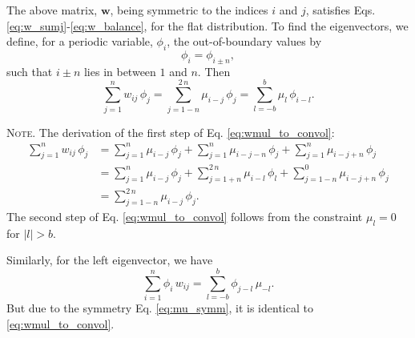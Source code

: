 \documentclass[reprint, floatfix]{revtex4-1}
\newcommand{\note}[1]{{\color{DarkGreen}\footnotesize \textsc{Note.} #1}}
\begin{document}
The above matrix, $\mathbf w$,
being symmetric to the indices $i$ and $j$,
satisfies Eqs. \eqref{eq:w_sumj}-\eqref{eq:w_balance},
for the flat distribution.
%
To find the eigenvectors,
we define, for a periodic variable, $\phi_i$,
the out-of-boundary values by
%
\begin{equation}
  \phi_i = \phi_{i \pm n},
\label{eq:phi_pbc}
\end{equation}
%
such that $i \pm n$ lies in between $1$ and $n$.
%
Then
%
\begin{equation}
  \sum_{ j = 1 }^n
    w_{ij} \, \phi_j
  =
  \sum_{ j = 1 - n }^{ 2 \, n }
    \mu_{i - j} \, \phi_j
  =
  \sum_{ l = -b }^{ b }
    \mu_l \, \phi_{ i - l}
  .
\label{eq:wmul_to_convol}
\end{equation}
%
\note{The derivation of the first step of
  Eq. \eqref{eq:wmul_to_convol}:
$$
\begin{aligned}
  \sum_{j = 1}^n
    w_{ij} \, \phi_j
  &=
  \sum_{j = 1}^n
    \mu_{i - j} \, \phi_j
  +
  \sum_{j = 1}^n
    \mu_{i - j - n} \, \phi_j
  +
  \sum_{j = 1}^n
    \mu_{i - j + n} \, \phi_j
  \\
  &=
  \sum_{j = 1}^n
    \mu_{i - j} \, \phi_j
  +
  \sum_{j = 1+n}^{2 \, n}
    \mu_{i - l} \, \phi_l
  +
  \sum_{j = 1-n}^0
    \mu_{i - j + n} \, \phi_j
  \\
  &=
  \sum_{j = 1-n}^{2 \, n}
    \mu_{i - j} \, \phi_j
  .
\end{aligned}
$$
The second step of Eq. \eqref{eq:wmul_to_convol}
follows from the constraint $\mu_l = 0$ for $|l| > b$.

Similarly,
for the left eigenvector, we have
$$
  \sum_{ i = 1 }^n
    \phi_i \, w_{ij}
  =
  \sum_{ l = -b }^b
    \phi_{j - l} \, \mu_{-l}
  .
$$
But due to the symmetry Eq. \eqref{eq:mu_symm},
it is identical to \eqref{eq:wmul_to_convol}.
}
\end{document}
